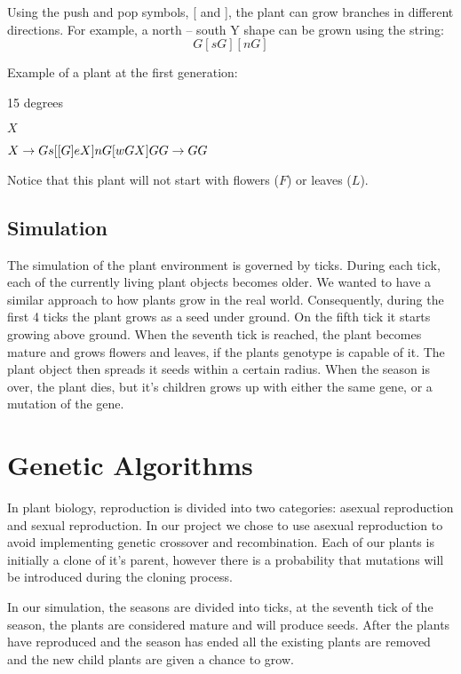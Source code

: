 \documentclass[conference]{acmsiggraph}
\begin{document}
Using the push and pop symbols, {[} and {]}, the plant can grow branches in
different directions. For example, a north -- south Y shape can be grown using
the string: \[ G [ s G ] [ n G ] \]

Example of a plant at the first generation:

\begin{description}[leftmargin=!,labelindent=0.2in,labelwidth=0.4in]
  \item[Angle] 15 degrees
  \item[Axiom] $ X $
  \item[Rules] $ X \rightarrow Gs[[G]eX]nG[wGX]G \\
                 G \rightarrow GG $
\end{description}

Notice that this plant will not start with flowers ($F$) or leaves ($L$).

\subsection{Simulation}

The simulation of the plant environment is governed by ticks. During each tick,
each of the currently living plant objects becomes older. We wanted to have a
similar approach to how plants grow in the real world. Consequently, during the
first 4 ticks the plant grows as a seed under ground. On the fifth tick it
starts growing above ground. When the seventh tick is reached, the plant becomes
mature and grows flowers and leaves, if the plants genotype is capable of it.
The plant object then spreads it seeds within a certain radius. When the season
is over, the plant dies, but it's children grows up with either the same gene,
or a mutation of the gene.

\section{Genetic Algorithms}

In plant biology, reproduction is divided into two categories: asexual
reproduction and sexual reproduction. In our project we chose to use asexual
reproduction to avoid implementing genetic crossover and recombination. Each of
our plants is initially a clone of it's parent, however there is a probability
that mutations will be introduced during the cloning process.\cite{plantrepo}

In our simulation, the seasons are divided into ticks, at the seventh tick of
the season, the plants are considered mature and will produce seeds. After the
plants have reproduced and the season has ended all the existing plants are
removed and the new child plants are given a chance to grow.
\end{document}
